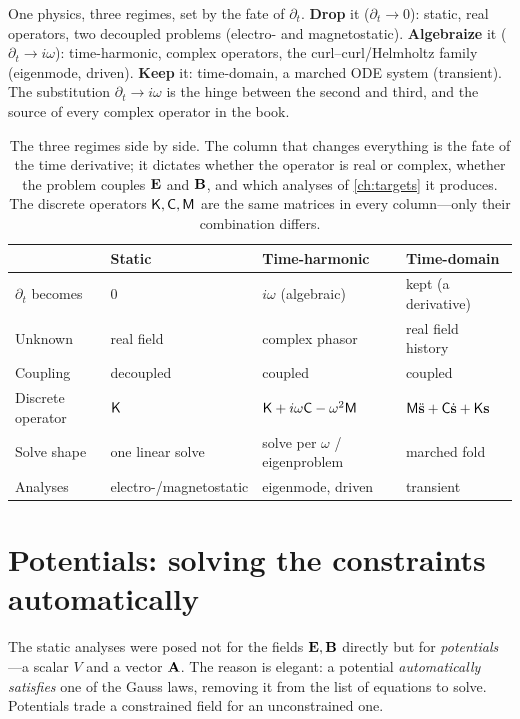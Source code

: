 \begin{keyidea}
One physics, three regimes, set by the fate of $\partial_t$. \textbf{Drop} it
($\partial_t\to0$): static, real operators, two decoupled problems (electro-
and magnetostatic). \textbf{Algebraize} it ($\partial_t\to i\omega$):
time-harmonic, complex operators, the curl--curl/Helmholtz family (eigenmode,
driven). \textbf{Keep} it: time-domain, a marched ODE system (transient). The
substitution $\partial_t\to i\omega$ is the hinge between the second and third,
and the source of every complex operator in the book.
\end{keyidea}

\begin{table}[t]
\centering
\caption[The three regimes, compared]{The three regimes side by side. The
column that changes everything is the fate of the time derivative; it dictates
whether the operator is real or complex, whether the problem couples $\mathbf{E}$ and
$\mathbf{B}$, and which analyses of \cref{ch:targets} it produces. The discrete
operators $\mathsf{K},\mathsf{C},\mathsf{M}$ are the same matrices in every column---only
their combination differs.}
\label{tab:regimes}
\small
\setlength{\tabcolsep}{5pt}
\renewcommand{\arraystretch}{1.3}
\begin{tabular}{@{}llll@{}}
\toprule
 & Static & Time-harmonic & Time-domain \\
\midrule
$\partial_t$ becomes & $0$ & $i\omega$ (algebraic) & kept (a derivative) \\
Unknown & real field & complex phasor & real field history \\
Coupling & decoupled & coupled & coupled \\
Discrete operator & $\mathsf{K}$ & $\mathsf{K}+i\omega\mathsf{C}-\omega^2\mathsf{M}$
  & $\mathsf{M}\ddot{\mathbf{s}}+\mathsf{C}\dot{\mathbf{s}}+\mathsf{K}\mathbf{s}$ \\
Solve shape & one linear solve & solve per $\omega$ / eigenproblem & marched fold \\
Analyses & electro-/magnetostatic & eigenmode, driven & transient \\
\bottomrule
\end{tabular}
\end{table}

\section{Potentials: solving the constraints automatically}
\label{sec:potentials}

The static analyses were posed not for the fields $\mathbf{E},\mathbf{B}$ directly but for
\emph{potentials}---a scalar $V$ and a vector $\mathbf{A}$. The reason is elegant: a
potential \emph{automatically satisfies} one of the Gauss laws, removing it
from the list of equations to solve. Potentials trade a constrained field for an
unconstrained one.

